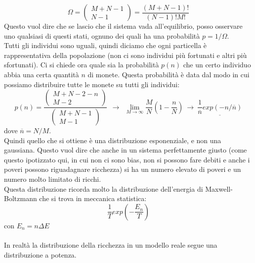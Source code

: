 \documentclass[12pt]{article}
\begin{document}
\begin{equation}
	\Omega = \begin{pmatrix}
	M + N - 1 \\
	N-1
	\end{pmatrix} = \frac{(M+N-1)!}{(N-1)!M!}
\end{equation}
Questo vuol dire che se lascio che il sistema vada all'equilibrio, posso osservare uno qualsiasi di questi stati, ognuno dei quali ha una probabilità $p = 1/\Omega$. \\
Tutti gli individui sono uguali, quindi diciamo che ogni particella è rappresentativa della popolazione (non ci sono individui più fortunati e altri più sfortunati). Ci si chiede ora quale sia la probabilità $p(n)$ che un certo individuo abbia una certa quantità $n$ di monete. Questa probabilità è data dal modo in cui possiamo distribuire tutte le monete su tutti gli individui:
\begin{equation}
	p(n) = \frac{\begin{pmatrix}
	M+N-2-n \\
	M-2
	\end{pmatrix}}{\begin{pmatrix}
	M+N-1 \\
	M-1
	\end{pmatrix}} \ \ \longrightarrow \ \ \lim_{M\rightarrow \infty} \frac{M}{N} \left(1 - \frac{n}{N} \right) \ \rightarrow \ \underline{\frac{1}{\overline{n}}exp(-n/\overline{n})}
\end{equation}
dove $\overline{n} = N/M$. \\
Quindi quello che si ottiene è una distribuzione esponenziale, e non una gaussiana. Questo vuol dire che anche in un sistema perfettamente giusto (come questo ipotizzato qui, in cui non ci sono bias, non si possono fare debiti e anche i poveri possono riguadagnare ricchezza) si ha un  numero elevato di poveri e un numero molto limitato di ricchi. \\
Questa distribuzione ricorda molto la distribuzione dell'energia di Maxwell-Boltzmann che si trova in meccanica statistica:
\begin{equation}
	\frac{1}{T}exp \left(-\frac{E_n}{T} \right)
\end{equation}
con $E_n = n \Delta E$ \\ \\
In realtà la distribuzione della ricchezza in un modello reale segue una distribuzione a potenza.
\end{document}
